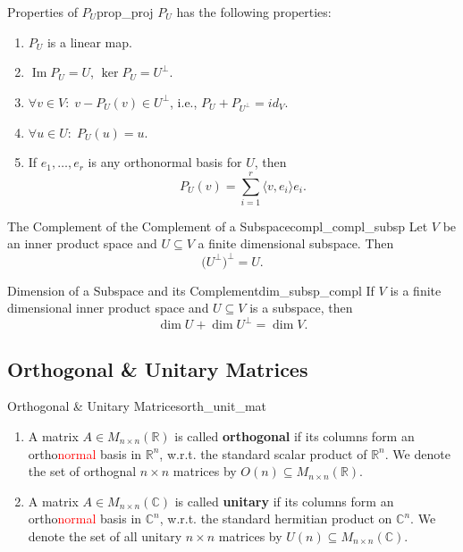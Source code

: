\begin{proposition}{Properties of $P_U$}{prop_proj}
	$P_U$ has the following properties:
	\begin{enumerate}
		\item $P_U$ is a linear map.
		\item $\operatorname{Im} P_U = U$, $\ker P_U = U^{\perp}$.
		\item $\forall v \in V : \; v - P_U(v) \in U^{\perp}$, i.e., $P_U + P_{U^{\perp}} = id_V$.
		\item $\forall u \in U : \; P_U(u) = u$.
		\item If $e_1, \hdots , e_r$ is any orthonormal basis for $U$, then
		\[
			P_U(v) = \sum_{i=1}^{r} \langle v , e_i \rangle e_i.
		\]
	\end{enumerate}
\end{proposition}

\begin{corollary}{The Complement of the Complement of a Subspace}{compl_compl_subsp}
	Let $V$ be an inner product space and $U \subseteq V$ a finite dimensional subspace. Then 
	\[
		\big(U^{\perp}\big)^{\perp} = U.
	\]
\end{corollary}

\begin{corollary}{Dimension of a Subspace and its Complement}{dim_subsp_compl}
	If $V$ is a finite dimensional inner product space and $U \subseteq V$ is a subspace, then 
	\[
		\dim U + \dim U^{\perp} = \dim V.
	\]
\end{corollary}

\subsection{Orthogonal \& Unitary Matrices}
\begin{definition}{Orthogonal \& Unitary Matrices}{orth_unit_mat}
	\begin{enumerate}
		\item 	A matrix $A \in M_{n\times n}(\mathbb{R})$ is called \textbf{orthogonal} if its columns form an ortho\textcolor{red}{normal} basis in $\mathbb{R}^n$, w.r.t. the standard scalar product of $\mathbb{R}^n$. We denote the set of orthognal $n \times n$ matrices by $O(n) \subseteq M_{n \times n}(\mathbb{R})$.
		
		\item A matrix $A \in M_{n\times n}(\mathbb{C})$ is called \textbf{unitary} if its columns form an ortho\textcolor{red}{normal} basis in $\mathbb{C}^n$, w.r.t. the standard hermitian product on $\mathbb{C}^n$. We denote the set of all unitary $n \times n$ matrices by $U(n) \subseteq M_{n\times n}(\mathbb{C})$. 
	\end{enumerate}	
\end{definition}


